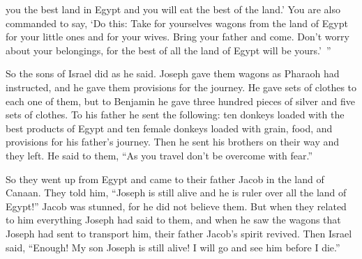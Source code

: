 {you the best
land
in Egypt
and you will eat
the
best
of the land.’
You
are also commanded
to say, ‘Do
this: Take
for yourselves wagons
from the land
of Egypt
for your little ones
and for your wives.
Bring
your father
and come.
Don’t
worry
about your belongings,
for
the best
of all
the land
of Egypt will be yours.’ ”
\par }{\PP {}So
the sons
of Israel
did
as he said. Joseph
gave
them wagons
as Pharaoh
had instructed,
and he gave
them provisions
for the journey.
He gave
sets
of clothes
to each one of them, but to Benjamin
he gave
three
hundred
pieces of silver
and five
sets
of clothes.
To his father
he sent
the following: ten
donkeys
loaded
with the best products
of Egypt
and ten
female donkeys
loaded
with grain,
food,
and provisions
for his father’s
journey.
Then he sent
his brothers
on
their way
and they left.
He said
to them,
“As you travel
don’t
be overcome with fear.”
\par }{\PP {}So they went up
from Egypt
and came
to their father
Jacob
in the land
of Canaan.
They told
him, “Joseph
is still
alive
and he is ruler
over all
the land
of Egypt!” Jacob was stunned,
for
he did not
believe them.
But when
they related
to
him everything
Joseph
had
said
to them,
and when he saw
the wagons
that
Joseph
had
sent
to transport
him, their father
Jacob’s
spirit
revived.
Then Israel
said,
“Enough! My son
Joseph
is still
alive! I will go
and see
him before
I die.”

}
